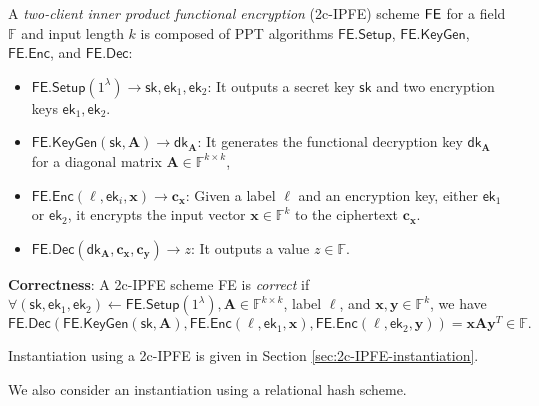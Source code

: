 \begin{definition}
\label{def:2c-IPFE}
	A \emph{two-client inner product functional encryption} (2c-IPFE) scheme $\sf FE$ for a field $\mathbb{F}$ and input length $k$ is composed of PPT algorithms $\textsf{FE.Setup}$, $\textsf{FE.KeyGen}$, $\textsf{FE.Enc}$, and $\textsf{FE.Dec}$:

	\begin{itemize}
	
		\item $\textsf{FE.Setup}(1^\lambda) \to \textsf{sk}, \textsf{ek}_1, \textsf{ek}_2$: It outputs a secret key $\textsf{sk}$ and two encryption keys $\textsf{ek}_1, \textsf{ek}_2$.
	
		\item $\textsf{FE.KeyGen}(\textsf{sk}, \mathbf{A}) \to \textsf{dk}_\mathbf{A}$: It generates the functional decryption key $\textsf{dk}_\mathbf{A}$ for a diagonal matrix $\mathbf{A} \in \mathbb{F}^{k \times k}$,  
	
		\item $\textsf{FE.Enc}(\ell, \textsf{ek}_i, \mathbf{x}) \to \mathbf{c_x}$: Given a label $\ell$ and an encryption key, either $\textsf{ek}_1$ or $\textsf{ek}_2$, it encrypts the input vector $\mathbf{x} \in \mathbb{F}^k$ to the ciphertext $\mathbf{c_x}$. 
	
		\item $\textsf{FE.Dec}(\textsf{dk}_\mathbf{A}, \mathbf{c_x}, \mathbf{c_y}) \to z$: It outputs a value $z \in \mathbb{F}$.
	
	\end{itemize}
	
	\noindent \textbf{Correctness}: A 2c-IPFE scheme \textsf{FE} is \emph{correct} if $\forall (\textsf{sk}, \textsf{ek}_1, \textsf{ek}_2) \gets \textsf{FE.Setup}(1^\lambda), \mathbf{A} \in \mathbb{F}^{k \times k}$, label $\ell$, and $ \mathbf{x}, \mathbf{y} \in \mathbb{F}^k$, we have
	\[
		\textsf{FE.Dec}(\textsf{FE.KeyGen}(\textsf{sk},  \mathbf{A}), \textsf{FE.Enc}(\ell, \textsf{ek}_1, \mathbf{x}), \textsf{FE.Enc}(\ell, \textsf{ek}_2, \mathbf{y}) ) = \mathbf{x} \mathbf{A} \mathbf{y}^T \in \mathbb{F}.
	\]

\end{definition}

Instantiation using a 2c-IPFE is given in Section \ref{sec:2c-IPFE-instantiation}.

We also consider an instantiation using a relational hash scheme.

